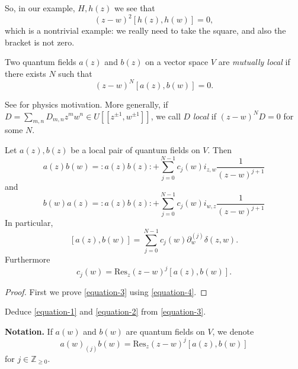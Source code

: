 So, in our example, $H,h(z)$ we see that
$$
(z-w)^2[h(z),h(w)]=0,
$$
which is a nontrivial example: we really need to 
take the square, and also the bracket is not zero.

\medskip\noindent
\begin{definition}
\label{definition-mutually-local-quantum-fields}
Two quantum fields $a(z)$ and $b(z)$ on a vector space
$V$ are {\it mutually local} if there exists $N$ 
such that
$$
(z-w)^N[a(z),b(w)]=0.
$$
\end{definition}

\begin{remark}
\label{remark-motivation}
See  \cite[Chapter 1]{KVA} for physics motivation.
More generally, if $D=\sum_{m,n}D_{m,n}z^mw^n \in U[\![z^{\pm 1}, w^{\pm
1}]\!]$,
we call $D$ {\it local} if $(z-w)^ND=0$ for some $N$.
\end{remark}

\begin{proposition}
\label{proposition-}
Let $a(z),b(z)$ be a local pair of quantum fields on $V$.
Then 
\begin{equation}
\label{equation-1}
a(z)b(w)= :\!a(z)b(z)\!:+\sum_{j=0}^{N-1}c_j(w)
i_{z,w}\frac{1}{(z-w)^{j+1}}
\end{equation}
and
\begin{equation}
\label{equation-2}
b(w)a(z)=:\!a(z)b(z)\!:+\sum_{j=0}^{N-1}c_j(w)
i_{w,z}\frac{1}{(z-w)^{j+1}}
\end{equation}
In particular,
\begin{equation}
\label{equation-3}
[a(z),b(w)]=\sum_{j=0}^{N-1}c_j(w)\partial_w^{(j)}\delta(z,w).
\end{equation}
Furthermore
\begin{equation}
\label{equation-4}
c_j(w)=\text{Res}_z(z-w)^j[a(z),b(w)].
\end{equation}
\end{proposition}

\begin{proof}
First we prove \ref{equation-3} using \ref{equation-4}. 
\end{proof}

\begin{exercise}
\label{exercise-deduce-1-and-2-from-3}
Deduce \ref{equation-1} and  \ref{equation-2} from \ref{equation-3}.
\end{exercise}

\medskip\noindent
{\bf Notation.} If $a(w)$ and $b(w)$ are quantum fields on $V$,
we denote
$$
a(w)_{(j)}b(w)=\text{Res}_z(z-w)^j[a(z),b(w)]
$$
for $j \in \mathbb{Z}_{\geq 0}$.


